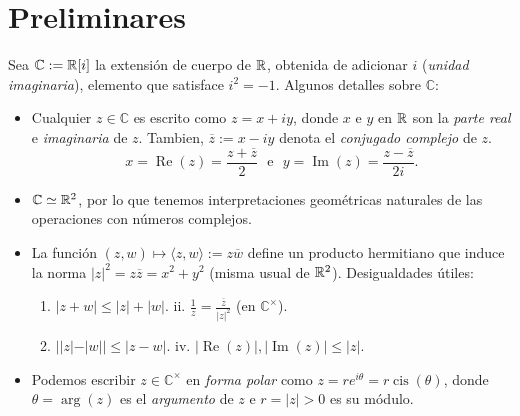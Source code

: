 \section{Preliminares}

\newcommand{\C}{\mathbb{C}}
\newcommand{\e}{\operatorname{exp}}
\newcommand{\re}{\operatorname{Re}}
\newcommand{\im}{\operatorname{Im}}

Sea \(\C := \R[i] \) la extensión de cuerpo de \(\mathbb{R}\), obtenida de adicionar \(i\) (\emph{unidad imaginaria}), elemento que satisface \(i^2 = -1\). Algunos detalles sobre \(\C\): 
\begin{itemize}[left = 0.3cm]
    \item Cualquier \(z \in \C\) es escrito como \( z =  x + i y  \), donde \( x\) e \(y \) en \(\mathbb{R}\) son la \emph{parte real} e \emph{imaginaria} de \(z\). Tambien, \(\overline{z}:= x -iy\) denota el \emph{conjugado complejo} de \(z\). 
    \[x = \operatorname{Re}(z) = \frac{z + \overline{z}}{2} \ \ \ \text{e} \ \ \ y = \operatorname{Im}(z)= \frac{z - \overline{z}}{2i}.\]
    \item \(\C \simeq \R^2\), por lo que tenemos interpretaciones geométricas naturales de las operaciones con números complejos.
    \item La función \((z,w) \mapsto \langle z, w\rangle := z \overline{w}\) define un producto hermitiano que induce la norma \(|z|^2 = z\overline{z} = x^2 + y^2\) (misma usual de \(\mathbb{R}^2\)). Desigualdades útiles:  
    \begin{enumerate}[label = \roman*., left = 1.2cm]
        \item \(|z + w| \leq |z| + |w|\). \hspace{2cm} ii. \(\displaystyle\frac{1}{z} = \frac{\overline{z}}{|z|^2} \) (en \(\C^\times\)). 
        \item[iii.] \(||z| - |w|| \leq |z-w|\).  \hspace{1.6cm} iv. \(|\re(z)|, |\im(z) |\leq |z|\).
    \end{enumerate}
    \item Podemos escribir \(z \in \C^\times\) en \emph{forma polar} como \(z = re^{i\theta} = r\operatorname{cis}(\theta)\), donde \(\theta = \operatorname{arg}(z) \) es el \emph{argumento} de \(z\) e \(r = |z| > 0 \) es su módulo. 
\end{itemize}

